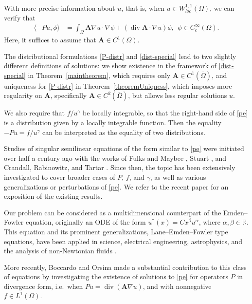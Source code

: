 \documentclass[12pt,a4paper]{amsart}
\theoremstyle{definition}
\newcommand{\R}{\mathbb{R}}
\newcommand{\A}{\mathbf{A}}
\newcommand*\Div{\operatorname{div}}
\begin{document}
With more precise information about $u$, that is, when $u\in W^{1,1}_{loc}(\Omega)$, we can verify that 
\begin{align}\label{dist-special}
  \langle -Pu,\phi    \rangle &= 
\int_\Omega \A\nabla u \cdot \nabla \phi + (\Div\A \cdot \nabla u )\phi , \ \ \phi\in C_c^\infty (\Omega).  
\end{align}
Here, it suffices to assume that $\A\in C^1(\Omega)$.

\smallskip
The distributional formulations \eqref{P-distr} and \eqref{dist-special} lead to two slightly different definitions of solutions: we show existence in the framework of \eqref{dist-special} in Theorem~\ref{maintheorem}, which requires only $\A \in C^1(\overline{\Omega})$, and uniqueness for \eqref{P-distr} in Theorem~\ref{theoremUniqness}, which imposes more regularity on $\A$, specifically $\A \in C^2(\overline{\Omega})$, but allows less regular solutions $u$. 

We also require that $f/u^\gamma$ be locally integrable, so that the right-hand side of \eqref{pe} is a distribution given by a locally integrable function. Then the equality $-Pu=f/u^\gamma$ can be interpreted as the equality of two distributions.

\smallskip

Studies of singular semilinear equations of the form similar to \eqref{pe} were initiated over half a century ago with the works of Fulks and Maybee \cite{MR123095}, Stuart \cite{MR404854}, and Crandall, Rabinowitz, and Tartar \cite{MR427826}. Since then, the topic has been extensively investigated to cover broader cases of $P$, $f$, and $\gamma$, as well as various generalizations or perturbations of \eqref{pe}. We refer to the recent paper \cite{MR4860322} for an exposition of the existing results. 

Our problem can be considered as a multidimensional counterpart of the Emden--Fowler equation, originally an ODE of the form $u^{''}(x)=Cx^\beta u^\alpha $, where $\alpha,\beta\in \R$. %
This equation and its prominent generalizations, Lane--Emden--Fowler 
type equations, have been applied in science, electrical engineering, astrophysics, and the analysis of non-Newtonian fluids \cite{Emden-Fowleraplication,cosmologicalModel, LUNING1984145, Emden-FowlerOverview}. 

More recently, Boccardo and Orsina \cite{MR2592976} made a substantial contribution to this class of equations by investigating the existence of solutions to \eqref{pe} 
for operators $P$ in divergence form, i.e.~when $Pu=\Div\left(\A\nabla u\right)$, and with nonnegative $f\in L^1(\Omega)$.
\end{document}

